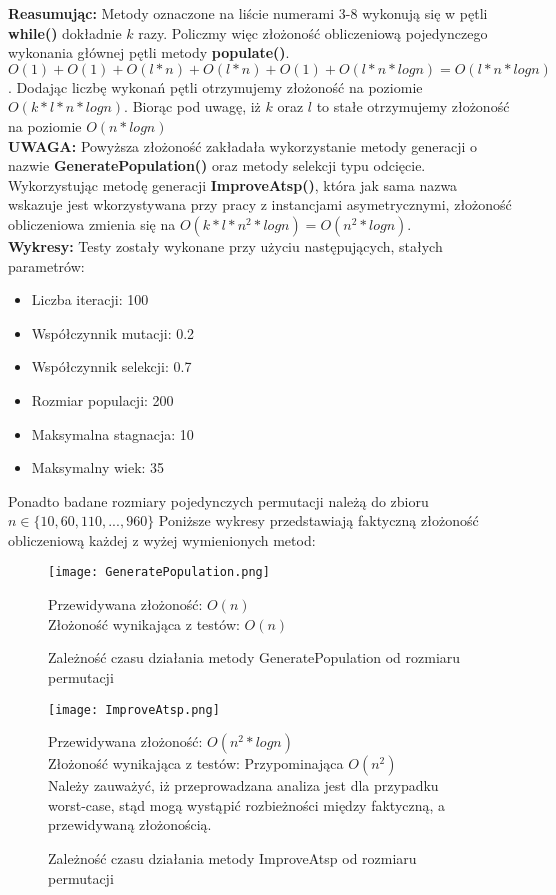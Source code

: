   \textbf{Reasumując: } Metody oznaczone na liście numerami 3-8 wykonują się w pętli \textbf{while()} dokładnie $k$ razy. Policzmy więc złożoność obliczeniową pojedynczego wykonania głównej pętli metody \textbf{populate()}. \\
  $O(1) + O(1) + O(l*n) + O(l*n)  + O(1) + O(l*n*logn) = O(l*n*logn)$. Dodając liczbę wykonań pętli otrzymujemy złożoność na poziomie $O(k*l*n*logn)$. Biorąc pod uwagę, iż $k$ oraz $l$ to stałe otrzymujemy złożoność na poziomie $O(n*logn)$\\
  \textbf{UWAGA:} Powyższa złożoność zakładała wykorzystanie metody generacji o nazwie \textbf{GeneratePopulation()} oraz metody selekcji typu odcięcie. Wykorzystując metodę generacji \textbf{ImproveAtsp()}, która jak sama nazwa wskazuje jest wkorzystywana przy pracy z instancjami asymetrycznymi,
  złożoność obliczeniowa zmienia się na $O(k*l*n^{2}*logn) = O(n^{2}*logn)$. \\
  \textbf{Wykresy:}
  Testy zostały wykonane przy użyciu następujących, stałych parametrów:
  \begin{itemize}
    \item Liczba iteracji: 100
    \item Współczynnik mutacji: 0.2
    \item Współczynnik selekcji: 0.7
    \item Rozmiar populacji: 200
    \item Maksymalna stagnacja: 10
    \item Maksymalny wiek: 35
  \end{itemize}
  Ponadto badane rozmiary pojedynczych permutacji należą do zbioru $n \in \{10,60,110,...,960\}$
  Poniższe wykresy przedstawiają faktyczną złożoność obliczeniową każdej z wyżej wymienionych metod:
  \begin{figure}[H]
    \texttt{[image: GeneratePopulation.png]}
    \centering
    \caption{Zależność czasu działania metody GeneratePopulation od rozmiaru permutacji}
    Przewidywana złożoność: $O(n)$ \\
    Złożoność wynikająca z testów: $O(n)$ \\
  \end{figure}
  \begin{figure}[H]
    \texttt{[image: ImproveAtsp.png]}
    \centering
    \caption{Zależność czasu działania metody ImproveAtsp od rozmiaru permutacji}
    Przewidywana złożoność: $O(n^2*logn)$ \\
    Złożoność wynikająca z testów: Przypominająca $O(n^2)$ \\
    Należy zauważyć, iż przeprowadzana analiza jest dla przypadku worst-case, stąd mogą wystąpić rozbieżności między faktyczną, a przewidywaną złożonością.
  \end{figure}
